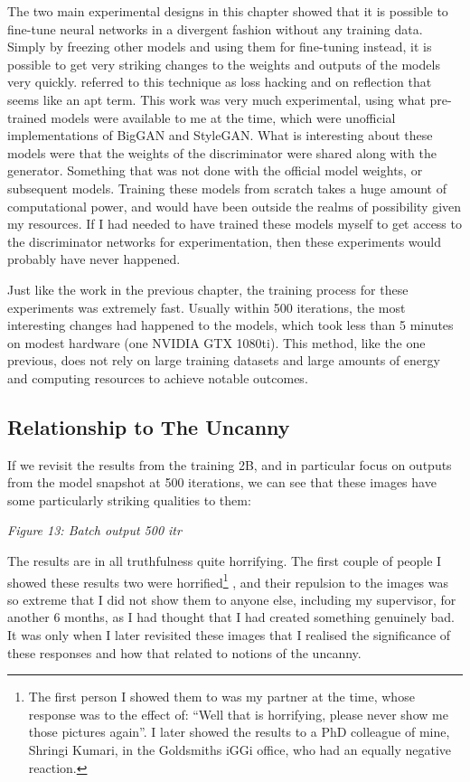 The two main experimental designs in this chapter showed that it is possible to fine-tune neural networks in a divergent fashion without any training data. 
Simply by freezing other models and using them for fine-tuning instead, it is possible to get very striking changes to the weights and outputs of the models very quickly. 
\cite{berns2020bridging} referred to this technique as loss hacking and on reflection that seems like an apt term. 
This work was very much experimental, using what pre-trained models were available to me at the time, which were unofficial implementations of BigGAN and StyleGAN. 
What is interesting about these models were that the weights of the discriminator were shared along with the generator. 
Something that was not done with the official model weights, or subsequent models. 
Training these models from scratch takes a huge amount of computational power, and would have been outside the realms of possibility given my resources. 
If I had needed to have trained these models myself to get access to the discriminator networks for experimentation, then these experiments would probably have never happened. 

Just like the work in the previous chapter, the training process for these experiments was extremely fast. 
Usually within 500 iterations, the most interesting changes had happened to the models, which took less than 5 minutes on modest hardware (one NVIDIA GTX 1080ti). 
This method, like the one previous, does not rely on large training datasets and large amounts of energy and computing resources to achieve notable outcomes. 

\subsection{Relationship to The Uncanny}

If we revisit the results from the training 2B, and in particular focus on outputs from the model snapshot at 500 iterations, we can see that these images have some particularly striking qualities to them:

\textit{Figure 13: Batch output 500 itr}

The results are in all truthfulness quite horrifying. 
The first couple of people I showed these results two were horrified\footnote{
    The first person I showed them to was my partner at the time, whose response was to the effect of: ``Well that is horrifying, please never show me those pictures again''. I later showed the results to a PhD colleague of mine, Shringi Kumari, in the Goldsmiths iGGi office, who had an equally negative reaction.}
, and their repulsion to the images was so extreme that I did not show them to anyone else, including my supervisor, for another 6 months, as I had thought that I had created something genuinely bad. 
It was only when I later revisited these images that I realised the significance of these responses and how that related to notions of the uncanny. 

